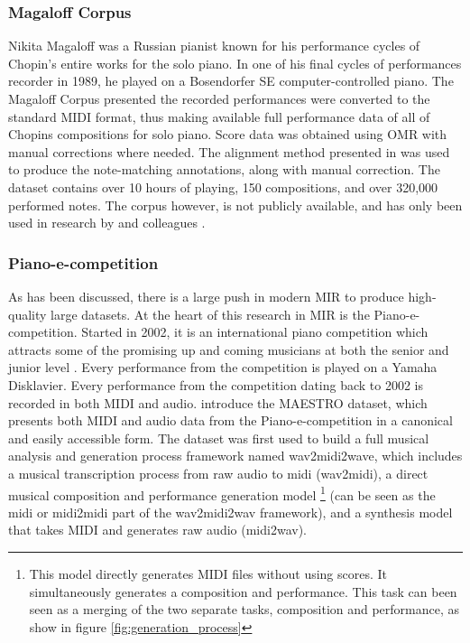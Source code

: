 \subsubsection{Magaloff Corpus}
Nikita Magaloff was a Russian pianist known for his performance cycles of Chopin's entire works for the solo piano. In one of his final cycles of performances recorder in 1989, he played on a Bosendorfer SE computer-controlled piano. The Magaloff Corpus \cite{flossmann2010magaloff} presented the recorded performances were converted to the standard MIDI format\cite{eduardo2018computational}, thus making available full performance data of all of Chopins compositions for solo piano. Score data was obtained using OMR with manual corrections where needed.  The alignment method presented in \cite{grachten2006expressivity} was used to produce the note-matching annotations, along with manual correction. The dataset contains over 10 hours of playing, 150 compositions, and over 320,000 performed notes. The corpus however, is not publicly available, and has only been used in research by \citet{flossmann2010magaloff} and colleagues \cite{eduardo2018computational}. 

\subsubsection{Piano-e-competition}
As has been discussed, there is a large push in modern MIR to produce high-quality large datasets. At the heart of this research in MIR is the Piano-e-competition. Started in 2002, it is an international piano competition which attracts some of the promising up and coming musicians at both the senior and junior level \cite{the-disklavier-education-network}. Every performance from the competition is played on a Yamaha Disklavier. Every performance from the competition dating back to 2002 is recorded in both MIDI and audio. \citet{hawthorne2018enabling} introduce the MAESTRO dataset, which presents both MIDI and audio data from the Piano-e-competition in a canonical and easily accessible form. The dataset was first used to build a full musical analysis and generation process framework named wav2midi2wave, which includes a musical transcription process \cite{hawthorne2017onsets} from raw audio to midi (wav2midi), a direct musical composition and performance generation model \cite{huang2018music} \footnote{This model directly generates MIDI files without using scores. It simultaneously generates a composition and performance. This task can been seen as a merging of the two separate tasks, composition and performance, as show in figure \ref{fig:generation_process}} (can be seen as the midi or midi2midi part of the wav2midi2wav framework), and a synthesis model that takes MIDI and generates raw audio\cite{oord2016wavenet} (midi2wav). 

